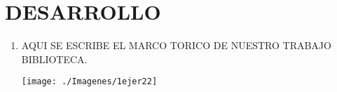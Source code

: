 \section{DESARROLLO} 

\begin{enumerate}[1.]
	\item AQUI SE ESCRIBE EL MARCO TORICO DE NUESTRO TRABAJO BIBLIOTECA.
    


	\begin{center}
	\texttt{[image: ./Imagenes/1ejer22]} 
	\end{center}

\end{enumerate} 